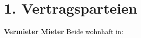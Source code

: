 \section*{1. Vertragsparteien}
\textbf{Vermieter}
\ContractLandlordsDE
\vspace{0.5cm}
\textbf{Mieter}
\ContractTenantsDE
Beide wohnhaft in: \Propaddress
